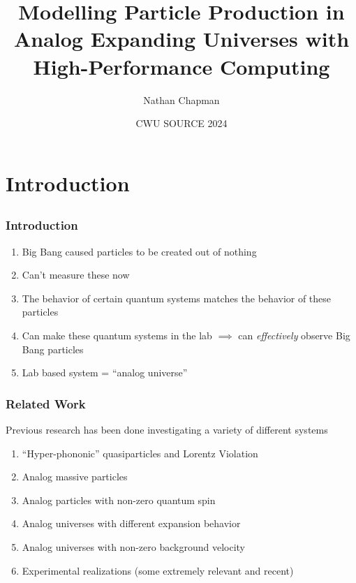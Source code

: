 \documentclass[aspectratio=169]{beamer}
\title[Particle Production]{Modelling Particle Production in Analog Expanding Universes with High-Performance Computing}
\author[Chapman, Nathan]{Nathan Chapman}
\institute[CWU]
{
  Department of Computer Science \\
  Department of Physics \\
  Central Washington University
}
\date[SOURCE 2024]{CWU SOURCE 2024}
\begin{document}
\frame{\titlepage}



\section{Introduction}
\subsection{}
\begin{frame}
    \frametitle{Introduction}

    \begin{enumerate}
        \item Big Bang caused particles to be created out of nothing
        \item Can't measure these now
        \item The behavior of certain quantum systems matches the behavior of these particles
        \item Can make these quantum systems in the lab $\implies$ can \emph{effectively} observe Big Bang particles
        \item Lab based system = ``analog universe''
    \end{enumerate}

\end{frame}

\begin{frame}
    \frametitle{Related Work}

    Previous research has been done investigating a variety of different systems
        \begin{enumerate}
            \item ``Hyper-phononic'' quasiparticles and Lorentz Violation%
            \item Analog massive particles%
            \item Analog particles with non-zero quantum spin%
            \item Analog universes with different expansion behavior%
            \item Analog universes with non-zero background velocity%
            \item Experimental realizations (some extremely relevant and recent)%
        \end{enumerate}

\end{frame}
\end{document}
